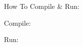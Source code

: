 How To Compile \& Run\+:

Compile\+: 
\begin{DoxyCode}{0}

\end{DoxyCode}
 Run\+: 
\begin{DoxyCode}{0}

\end{DoxyCode}
 